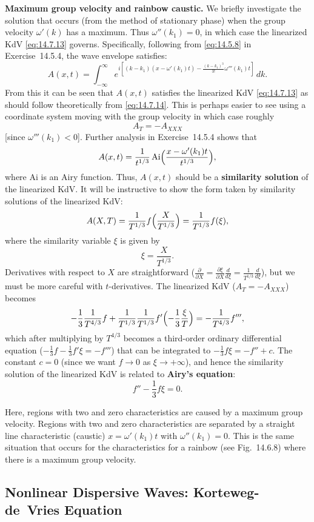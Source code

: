 \textbf{Maximum group velocity and rainbow caustic.}  We briefly investigate the solution that occurs (from the method of stationary phase) when the group velocity $\omega'(k)$ has a maximum.  Thus $\omega''(k_1) = 0$, in which case the linearized KdV \eqref{eq:14.7.13} governs.  Specifically, following from \eqref{eq:14.5.8} in Exercise~14.5.4, the wave envelope satisfies:
\[
A(x,t) = \int_{-\infty}^{\infty} e^{i[(k-k_1)(x - \omega'(k_1)t) - \frac{(k-k_1)^3}{3!}\omega'''(k_1)t]}\,dk.
\]
From this it can be seen that $A(x,t)$ satisfies the linearized KdV \eqref{eq:14.7.13} as should follow theoretically from \eqref{eq:14.7.14}.  This is perhaps easier to see using a coordinate system moving with the group velocity in which case roughly
\[
A_T = -A_{XXX}
\]
[since $\omega'''(k_1) < 0$].  Further analysis in Exercise~14.5.4 shows that
\[
A(x,t) = \frac{1}{t^{1/3}}\,\text{Ai}\Bigl(\frac{x - \omega'(k_1)t}{t^{1/3}}\Bigr),
\]
where Ai is an Airy function.  Thus, $A(x,t)$ should be a \textbf{similarity solution} of the linearized KdV.  It will be instructive to show the form taken by similarity solutions of the linearized KdV:
\[
A(X,T) = \frac{1}{T^{1/3}}f\Bigl(\frac{X}{T^{1/3}}\Bigr) = \frac{1}{T^{1/3}}f(\xi),
\]
where the similarity variable $\xi$ is given by
\[
\xi = \frac{X}{T^{1/3}}.
\]
Derivatives with respect to $X$ are straightforward ($\frac{\partial}{\partial X} = \frac{\partial\xi}{\partial X}\frac{d}{d \xi} = \frac{1}{T^{1/3}}\frac{d}{d \xi}$), but we must be more careful with $t$-derivatives.  The linearized KdV ($A_T = -A_{XXX}$) becomes
\[
-\frac{1}{3}\frac{1}{T^{4/3}}f + \frac{1}{T^{1/3}}\frac{1}{T^{1/3}}f'\Bigl(-\frac{1}{3}\frac{\xi}{T}\Bigr) = -\frac{1}{T^{4/3}}f''',
\]
which after multiplying by $T^{4/3}$ becomes a third-order ordinary differential equation ($-\frac{1}{3}f - \frac{1}{3}f'\xi = -f'''$) that can be integrated to $-\frac{1}{3}f\xi = -f'' + c$.  The constant $c = 0$ (since we want $f \to 0$ as $\xi \to +\infty$), and hence the similarity solution of the linearized KdV is related to \textbf{Airy's equation}:
\[
f'' - \frac{1}{3}f\xi = 0.
\]

Here, regions with two and zero characteristics are caused by a maximum group velocity.  Regions with two and zero characteristics are separated by a straight line characteristic (caustic) $x = \omega'(k_1)t$ with $\omega''(k_1) = 0$.  This is the same situation that occurs for the characteristics for a rainbow (see Fig.~14.6.8) where there is a maximum group velocity.

\subsection{Nonlinear Dispersive Waves: Korteweg-de~Vries Equation}
\label{sec:kdv-equation}


